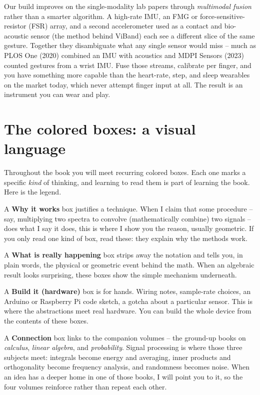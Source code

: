Our build improves on the single-modality lab papers through
\emph{multimodal fusion} rather than a smarter algorithm. A high-rate IMU, an FMG or force-sensitive-resistor (FSR) array, and a second accelerometer used
as a contact and bio-acoustic sensor (the method behind ViBand) each see a different slice of
the same gesture. Together they disambiguate what any single sensor would miss -- much as
PLOS One (2020) combined an IMU with acoustics and MDPI Sensors (2023) counted gestures from a
wrist IMU. Fuse those streams, calibrate per finger, and you have something more capable than
the heart-rate, step, and sleep wearables on the market today, which never attempt finger input at all.
The result is an instrument you can wear and play.

\section*{The colored boxes: a visual language}

Throughout the book you will meet recurring colored boxes. Each
one marks a specific \emph{kind} of thinking, and learning to read them is part of learning the
book. Here is the legend.

\begin{whybox}
A \textbf{Why it works} box justifies a technique. When I claim that some procedure -- say,
multiplying two spectra to convolve (mathematically combine) two signals -- does what I say it does, this is
where I show you the reason, usually geometric. If you only read one kind of box, read these:
they explain why the methods work.
\end{whybox}

\begin{happeningbox}
A \textbf{What is really happening} box strips away the notation and tells you, in plain
words, the physical or geometric event behind the math. When an algebraic result looks
surprising, these boxes show the simple mechanism underneath.
\end{happeningbox}

\begin{buildbox}
A \textbf{Build it (hardware)} box is for hands. Wiring notes, sample-rate choices, an
Arduino or Raspberry Pi code sketch, a gotcha about a particular sensor. This is where the
abstractions meet real hardware. You can build the whole device from the contents of these boxes.
\end{buildbox}

\begin{connectionbox}
A \textbf{Connection} box links to the companion volumes -- the ground-up books on
\emph{calculus}, \emph{linear algebra}, and \emph{probability}. Signal processing is where
those three subjects meet: integrals become energy and averaging, inner products and
orthogonality become frequency analysis, and randomness becomes noise. When an idea has a
deeper home in one of those books, I will point you to it, so the four volumes reinforce
rather than repeat each other.
\end{connectionbox}

